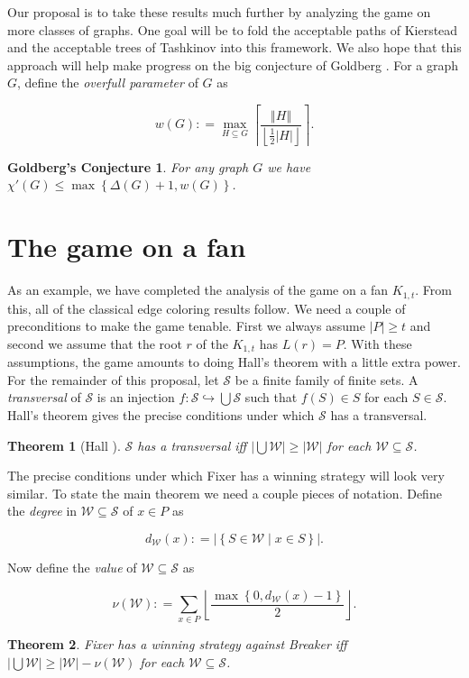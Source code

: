 \documentclass[12pt]{amsart}
\theoremstyle{plain}
\newtheorem{thm}{Theorem}[section]
\newtheorem*{GoldBerg}{Goldberg's Conjecture}
\theoremstyle{definition}
\theoremstyle{remark}
\newcommand{\fancy}[1]{\mathcal{#1}}
\newcommand{\inj}{\hookrightarrow}
\newcommand{\set}[1]{\left\{ #1 \right\}}
\newcommand{\setb}[3]{\left\{ #1 \in #2 \mid #3 \right\}}
\newcommand{\card}[1]{\left|#1\right|}
\newcommand{\size}[1]{\left\Vert#1\right\Vert}
\newcommand{\ceil}[1]{\left\lceil#1\right\rceil}
\newcommand{\floor}[1]{\left\lfloor#1\right\rfloor}
\newcommand{\funcinj}[3]{#1\colon #2 \inj #3}
\newcommand{\DefinedAs}{\mathrel{\mathop:}=}
\renewcommand{\S}{\fancy{S}}
\newcommand{\W}{\fancy{W}}
\begin{document}
Our proposal is to take these results much further by analyzing the game on more
classes of graphs.  One goal will be to fold the acceptable paths of Kierstead
\cite{kierstead1984chromatic} and the acceptable trees of Tashkinov
\cite{tashkinov} into this framework.  We also hope that this approach will help
make progress on the big conjecture of Goldberg \cite{goldberg}. For a graph
$G$, define the \emph{overfull parameter} of $G$ as

\[w(G) \DefinedAs \max_{H \subseteq G} \ceil{\frac{\size{H}}{\floor{\frac12
\card{H}}}}.\]

\begin{GoldBerg}
For any graph $G$ we have $\chi'(G) \leq \max \set{\Delta(G) + 1, w(G)}$.
\end{GoldBerg}

\section{The game on a fan}
As an example, we have completed the analysis of the game on a fan $K_{1,t}$.
From this, all of the classical edge coloring results follow.  We need a couple
of preconditions to make the game tenable.  First we always assume $\card{P}
\geq t$ and second we assume that the root $r$ of the $K_{1,t}$ has $L(r) = P$. 
With these assumptions, the game amounts to doing Hall's theorem with a little
extra power. For the remainder of this proposal, let $\S$ be a finite family of
finite sets. A \emph{transversal} of $\S$ is an injection $\funcinj{f}{\S}{\bigcup \S}$ such that $f(S) \in S$ for each $S \in \S$.  
Hall's theorem \cite{hall} gives the precise conditions under
which $\S$ has a transversal.

\begin{thm}[Hall \cite{hall}]
$\S$ has a transversal iff $\card{\bigcup \W} \geq \card{\W}$ for each $\W
\subseteq \S$.
\end{thm}

The precise conditions under which Fixer has a winning strategy will look very
similar.  To state the main theorem we need a couple pieces of notation. Define
the \emph{degree} in $\W \subseteq \S$ of $x \in P$ as

\[d_{\W}(x) \DefinedAs \card{\setb{S}{\W}{x \in S}}.\]

\noindent Now define the \emph{value} of $\W \subseteq \S$ as

\[\nu(\W) \DefinedAs \sum_{x \in P} \floor{\frac{\max\set{0, d_{\W}(x) -
1}}{2}}.\]

\begin{thm}\label{MainTheorem}
Fixer has a winning strategy against Breaker iff $\card{\bigcup \W} \geq
\card{\W} - \nu(\W)$ for each $\W \subseteq \S$.
\end{thm}
\end{document}
